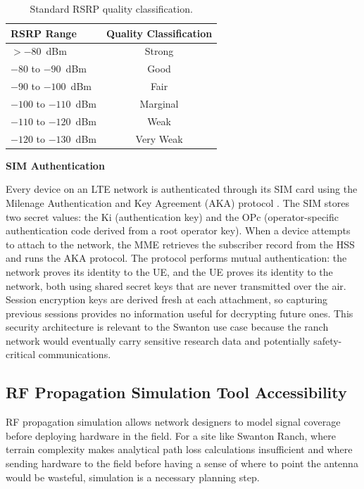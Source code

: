 \documentclass[
    left=1.5in,
    right=1.25in,
    top=1.25in,
    bottom=1.25in
]{CalPolySeniorProject}
\begin{document}
\begin{table}[!ht]
    \centering
    \caption[RSRP quality classification]{Standard RSRP quality
    classification.}
    \vspace{0.5\baselineskip}
    \begin{tabular}{lc}
        \toprule
        \textbf{RSRP Range} & \textbf{Quality Classification} \\
        \midrule
        $>-80$~dBm       & Strong     \\
        $-80$ to $-90$~dBm   & Good       \\
        $-90$ to $-100$~dBm  & Fair       \\
        $-100$ to $-110$~dBm & Marginal   \\
        $-110$ to $-120$~dBm & Weak       \\
        $-120$ to $-130$~dBm & Very Weak  \\
        \bottomrule
    \end{tabular}
    \label{tab:rsrp}
\end{table}

\textbf{SIM Authentication}

Every device on an LTE network is authenticated through its SIM card using the
Milenage Authentication and Key Agreement (AKA) protocol
\autocite{hpe2019cbrssignaling}. The SIM stores two secret values: the Ki
(authentication key) and the OPc (operator-specific authentication code derived
from a root operator key). When a device attempts to attach to the network, the
MME retrieves the subscriber record from the HSS and runs the AKA protocol. The
protocol performs mutual authentication: the network proves its identity to the
UE, and the UE proves its identity to the network, both using shared secret keys
that are never transmitted over the air. Session encryption keys are derived
fresh at each attachment, so capturing previous sessions provides no information
useful for decrypting future ones. This security architecture is relevant to the
Swanton use case because the ranch network would eventually carry sensitive
research data and potentially safety-critical communications.

\subsection{RF Propagation Simulation Tool Accessibility}

RF propagation simulation allows network designers to model signal coverage
before deploying hardware in the field. For a site like Swanton Ranch, where
terrain complexity makes analytical path loss calculations insufficient and where
sending hardware to the field before having a sense of where to point the
antenna would be wasteful, simulation is a necessary planning step.
\end{document}
